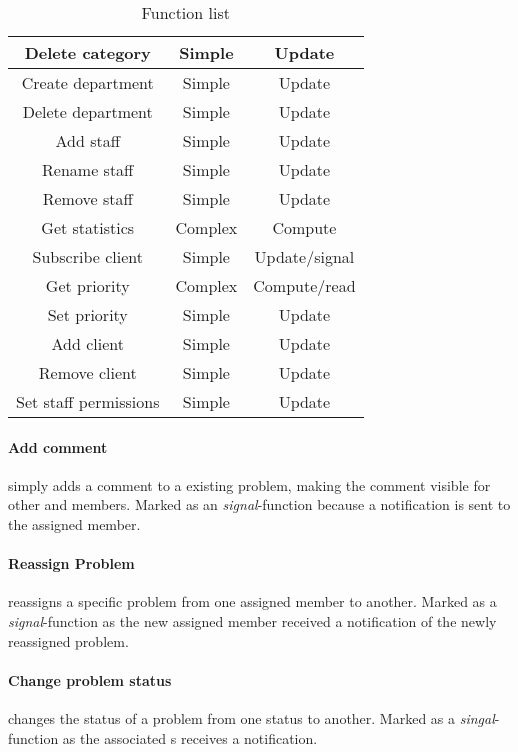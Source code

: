 \begin{table}[h]
\begin{center}
\begin{tabular}{|c|c|c|}
Delete category & Simple & Update \\ \hline%
Create department & Simple & Update \\ \hline%
Delete department & Simple & Update \\ \hline%
Add staff & Simple & Update \\ \hline%
Rename staff & Simple & Update \\ \hline%
Remove staff & Simple & Update \\ \hline%
Get statistics & Complex & Compute \\ \hline%
Subscribe client & Simple & Update/signal \\ \hline%
Get priority & Complex & Compute/read \\ \hline%
Set priority & Simple & Update \\ \hline%
Add client & Simple & Update \\ \hline%
Remove client & Simple & Update \\ \hline%
Set staff permissions & Simple & Update \\ \hline%

\end{tabular}
\end{center}
\caption{Function list}
\label{tab:functionlist}
\end{table}


\paragraph{Add comment} simply adds a comment to a existing problem, making the comment visible for other \client{} and \astaff[] members. Marked as an \textit{signal}-function because a notification is sent to the assigned \astaff[] member.  

\paragraph{Reassign Problem} reassigns a specific problem from one assigned \astaff[] member to another. Marked as a \textit{signal}-function as the new assigned \astaff[] member received a notification of the newly reassigned problem. 

\paragraph{Change problem status} changes the status of a problem from one status to another. Marked as a \textit{singal}-function as the associated \client s receives a notification. 

